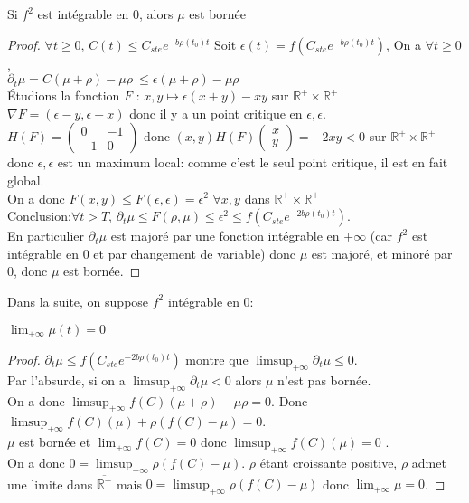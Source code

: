 \documentclass[11pt]{article}
\newcommand{\dt}{\partial_t}
\theoremstyle{definition}
\begin{document}
\begin{lemma} Si $f^2$ est intégrable en 0, alors $\mu$ est bornée
\end{lemma}
\begin{proof} $\forall t\geq 0$, $C(t)\leq C_{ste}e^{-b \rho(t_0)t} $ Soit $\epsilon(t)=f(C_{ste}e^{-b \rho(t_0)t} )$, On a $\forall t\geq 0$,\\ $\dt\mu  = C(\mu + \rho) -\mu\rho\ \leq \epsilon(\mu + \rho) -\mu\rho$ \\
Étudions la fonction $F$ : $x,y \mapsto \epsilon(x + y) -xy$ sur $\mathbb{R}^+ \times \mathbb{R}^+$\\
$\nabla F = (\epsilon-y, \epsilon-x)$ donc il y a un point critique en $\epsilon,\epsilon$.\\
$H(F) = \begin{pmatrix}
   0 & -1 \\
   -1 & 0 
\end{pmatrix}$ donc $(x,y)H(F)\begin{pmatrix} x \\ y \end{pmatrix} = -2xy < 0$ sur $\mathbb{R}^+ \times \mathbb{R}^+$ donc $\epsilon,\epsilon$ est un maximum local: comme c'est le seul point critique, il est en fait global.\\
On a donc $F(x,y)\leq F(\epsilon,\epsilon) = \epsilon^2 $ $\forall x,y$ dans $\mathbb{R}^+ \times \mathbb{R}^+$\\
Conclusion:$\forall t>T$,  $\dt\mu \leq F(\rho,\mu) \leq  \epsilon^2 \leq f(C_{ste}e^{-2b \rho(t_0)t})$. \\En particulier $\dt\mu$ est majoré par une fonction intégrable en $+\infty$ (car $f^2$ est intégrable en 0 et par changement de variable) donc $\mu$ est majoré, et minoré par $0$, donc $\mu$ est bornée.
\end{proof}
Dans la suite, on suppose $f^2$ intégrable en 0:
\begin{lemma} $\lim_{+\infty} \mu(t) = 0$
\end{lemma}
\begin{proof}
$\dt\mu \leq f(C_{ste}e^{-2b \rho(t_0)t})$ montre que $\limsup _{+\infty}\dt\mu \leq 0$.\\
Par l'absurde, si on a $\limsup _{+\infty}\dt\mu <0$ alors $\mu$ n'est pas bornée.\\
On a donc $\limsup_{+\infty}f(C)(\mu + \rho) -\mu\rho = 0$.
Donc $\limsup_{+\infty} f(C)(\mu) + \rho ( f(C)-\mu) = 0$.\\ $\mu$ est bornée et $\lim_{+\infty}f(C)=0$ donc $\limsup_{+\infty} f(C)(\mu) =0$ .\\
On a donc $0=  \limsup_{+\infty} \rho (f(C)-\mu)$. $\rho$ étant croissante positive, $\rho$ admet une limite dans  $\overline{\mathbb{R^+}}$ mais $0=  \limsup_{+\infty} \rho (f(C)-\mu)$ donc $\lim_{+\infty}\mu =0$.
\end{proof} 
\end{document}
